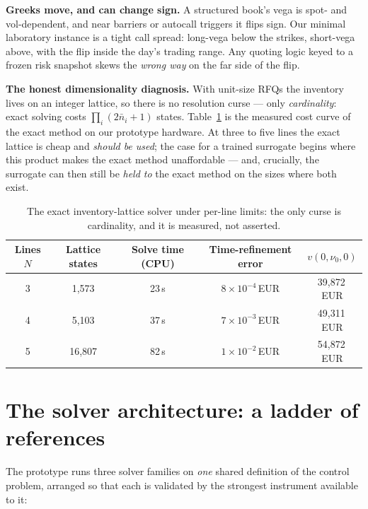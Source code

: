\documentclass[11pt,a4paper]{article}
\begin{document}
\textbf{Greeks move, and can change sign.} A structured book's vega is
spot- and vol-dependent, and near barriers or autocall triggers it flips
sign. Our minimal laboratory instance is a tight call spread: long-vega
below the strikes, short-vega above, with the flip inside the day's
trading range. Any quoting logic keyed to a frozen risk snapshot skews the
\emph{wrong way} on the far side of the flip.

\textbf{The honest dimensionality diagnosis.} With unit-size RFQs the
inventory lives on an integer lattice, so there is no resolution curse ---
only \emph{cardinality}: exact solving costs
$\prod_i(2\bar n_i+1)$ states. Table~\ref{tab:ladder} is the measured
cost curve of the exact method on our prototype hardware. At three to five
lines the exact lattice is cheap and \emph{should be used}; the case for a
trained surrogate begins where this product makes the exact method
unaffordable --- and, crucially, the surrogate can then still be
\emph{held to} the exact method on the sizes where both exist.

\begin{table}[htbp]
\centering
\begin{tabular}{ccccc}
\toprule
Lines $N$ & Lattice states & Solve time (CPU) & Time-refinement error &
$v(0,\nu_0,0)$ \\
\midrule
3 & 1{,}573  & 23\,s & $8\times10^{-4}$\,EUR & 39{,}872\,EUR \\
4 & 5{,}103  & 37\,s & $7\times10^{-3}$\,EUR & 49{,}311\,EUR \\
5 & 16{,}807 & 82\,s & $1\times10^{-2}$\,EUR & 54{,}872\,EUR \\
\bottomrule
\end{tabular}
\caption{The exact inventory-lattice solver under per-line limits: the
only curse is cardinality, and it is measured, not asserted.}
\label{tab:ladder}
\end{table}

\section{The solver architecture: a ladder of references}

The prototype runs three solver families on \emph{one} shared definition
of the control problem, arranged so that each is validated by the
strongest instrument available to it:
\end{document}
